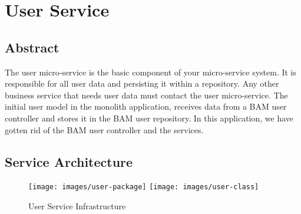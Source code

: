 \chapter{User Service}
\section{Abstract}
The user micro-service is the basic component of your micro-service system. It is responsible for all user data and persisting it within a repository. Any other business service that needs user data must contact the user micro-service. The initial user model in the monolith application, receives data from a BAM user controller and stores it in the BAM user repository. In this application, we have gotten rid of the BAM user controller and the services.

\section{Service Architecture}

\begin{figure}[htp]
\centering
\texttt{[image: images/user-package]}
\texttt{[image: images/user-class]}
\caption{User Service Infrastructure}
\label{fig:lion}
\end{figure}


